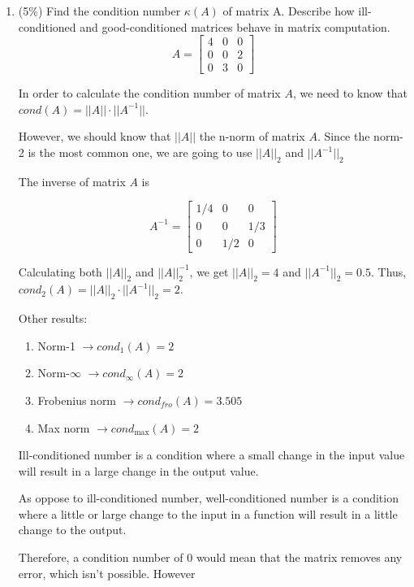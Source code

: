 \documentclass[a4paper,10pt]{article}
\begin{document}
\begin{enumerate}
\begin{enumerate}
{            To make sure all the values in the Hessian matrix above are positive, $\mu > 0$.
        }
    \end{enumerate}

\item (5\%) Find the condition number $\kappa(A)$ of matrix A. Describe how ill-
conditioned and good-conditioned matrices behave in matrix computation.
\[
    A = \begin{bmatrix} 4 & 0 & 0 \\0 & 0 & 2 \\0 & 3 & 0 \end{bmatrix}
\]

{\color{blue} 
In order to calculate the condition number of matrix $A$, we need to know that $cond(A) = ||A|| \cdot ||A^{-1}||$.

However, we should know that $||A||$ the n-norm of matrix $A$. Since the norm-2 is the most common one, we are going to use $||A||_2$ and $||A^{-1}||_2$ 

The inverse of matrix $A$ is

\[
    A^{-1} = \begin{bmatrix}
        1/4 & 0 & 0 \\ 0 & 0 & 1/3 \\ 0 & 1/2 & 0
    \end{bmatrix}
\]

Calculating both $||A||_2$ and $||A||^{-1}_2$, we get $||A||_2 = 4$ and $||A^{-1}||_2 = 0.5$.
Thus, $cond_2(A) = ||A||_2 \cdot ||A^{-1}||_2 = 2$.

Other results:
\begin{enumerate}
    \item Norm-1 $\rightarrow cond_1(A) = 2$
    \item Norm-$\infty$ $\rightarrow cond_\infty(A) = 2$
    \item Frobenius norm $\rightarrow cond_{fro}(A) = 3.505$
    \item Max norm $\rightarrow cond_{\max}(A) = 2$   
\end{enumerate}

Ill-conditioned number is a condition where a small change in the input value will result in a large change in the output value.

As oppose to ill-conditioned number, well-conditioned number is a condition where a little or large change to the input in a function will result in a little change to the output.

Therefore, a condition number of $0$ would mean that the matrix removes any error, which isn't possible. However

}
\end{enumerate}
\end{document}
